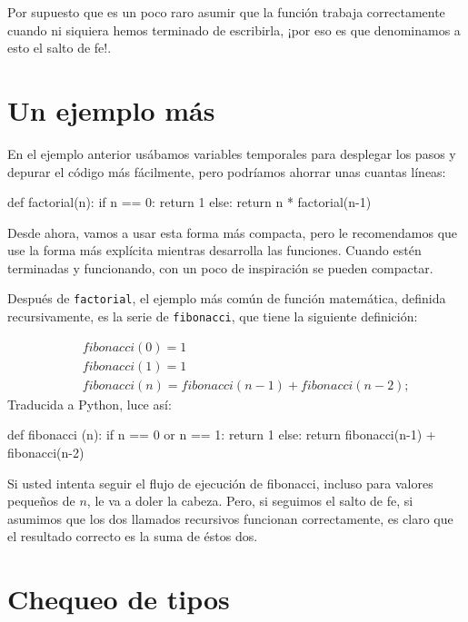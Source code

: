 Por supuesto que es un poco raro asumir que la función trabaja correctamente
cuando ni siquiera hemos terminado de escribirla, ¡por eso es que
denominamos a esto el salto de fe!.

\section{Un ejemplo más}

\label{one more example}

En el ejemplo anterior usábamos variables temporales para desplegar
los pasos y depurar el código más fácilmente, pero podríamos ahorrar
unas cuantas líneas:

\begin{pythoncode}
def factorial(n):
  if n == 0:
    return 1
  else:
    return n * factorial(n-1)
\end{pythoncode}
 Desde ahora, vamos a usar esta forma más compacta, pero le recomendamos
que use la forma más explícita mientras desarrolla las funciones.
Cuando estén terminadas y funcionando, con un poco de inspiración
se pueden compactar.


Después de \texttt{factorial}, el ejemplo más común de función matemática,
definida recursivamente, es la serie de \texttt{fibonacci}, que tiene
la siguiente definición:

\vspace{-0.25in}
 
\begin{eqnarray*}
 &  & fibonacci(0)=1\\
 &  & fibonacci(1)=1\\
 &  & fibonacci(n)=fibonacci(n-1)+fibonacci(n-2);
\end{eqnarray*}
Traducida a Python, luce así:

\begin{pythoncode}
def fibonacci (n):
  if n == 0 or n == 1:
    return 1
  else:
    return fibonacci(n-1) + fibonacci(n-2)
\end{pythoncode}
 Si usted intenta seguir el flujo de ejecución de fibonacci, incluso
para valores pequeños de $n$, le va a doler la cabeza. Pero, si seguimos
el salto de fe, si asumimos que los dos llamados recursivos funcionan
correctamente, es claro que el resultado correcto es la suma de éstos
dos.

\section{Chequeo de tipos}

